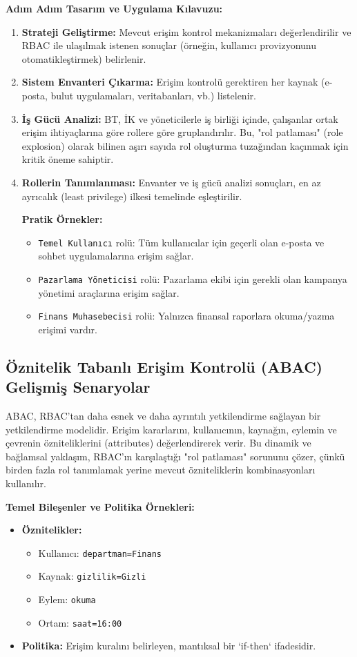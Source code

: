 \textbf{Adım Adım Tasarım ve Uygulama Kılavuzu:}
\begin{enumerate}
    \item \textbf{Strateji Geliştirme:} Mevcut erişim kontrol mekanizmaları değerlendirilir ve RBAC ile ulaşılmak istenen sonuçlar (örneğin, kullanıcı provizyonunu otomatikleştirmek) belirlenir.
    \item \textbf{Sistem Envanteri Çıkarma:} Erişim kontrolü gerektiren her kaynak (e-posta, bulut uygulamaları, veritabanları, vb.) listelenir.
    \item \textbf{İş Gücü Analizi:} BT, İK ve yöneticilerle iş birliği içinde, çalışanlar ortak erişim ihtiyaçlarına göre rollere göre gruplandırılır. Bu, "rol patlaması" (role explosion) olarak bilinen aşırı sayıda rol oluşturma tuzağından kaçınmak için kritik öneme sahiptir.
    \item \textbf{Rollerin Tanımlanması:} Envanter ve iş gücü analizi sonuçları, en az ayrıcalık (least privilege) ilkesi temelinde eşleştirilir.
    
    \textbf{Pratik Örnekler:}
    \begin{itemize}
        \item \verb|Temel Kullanıcı| rolü: Tüm kullanıcılar için geçerli olan e-posta ve sohbet uygulamalarına erişim sağlar.
        \item \verb|Pazarlama Yöneticisi| rolü: Pazarlama ekibi için gerekli olan kampanya yönetimi araçlarına erişim sağlar.
        \item \verb|Finans Muhasebecisi| rolü: Yalnızca finansal raporlara okuma/yazma erişimi vardır.
    \end{itemize}
\end{enumerate}

\subsection{Öznitelik Tabanlı Erişim Kontrolü (ABAC) Gelişmiş Senaryolar}

ABAC, RBAC'tan daha esnek ve daha ayrıntılı yetkilendirme sağlayan bir yetkilendirme modelidir. Erişim kararlarını, kullanıcının, kaynağın, eylemin ve çevrenin özniteliklerini (attributes) değerlendirerek verir. Bu dinamik ve bağlamsal yaklaşım, RBAC'ın karşılaştığı "rol patlaması" sorununu çözer, çünkü birden fazla rol tanımlamak yerine mevcut özniteliklerin kombinasyonları kullanılır.

\textbf{Temel Bileşenler ve Politika Örnekleri:}
\begin{itemize}
    \item \textbf{Öznitelikler:} 
    \begin{itemize}
        \item Kullanıcı: \verb|departman=Finans|
        \item Kaynak: \verb|gizlilik=Gizli|
        \item Eylem: \verb|okuma|
        \item Ortam: \verb|saat=16:00|
    \end{itemize}
    \item \textbf{Politika:} Erişim kuralını belirleyen, mantıksal bir `if-then` ifadesidir.
\end{itemize}

